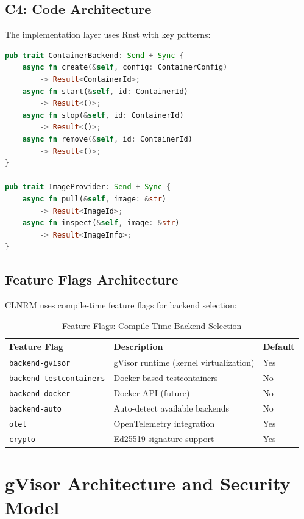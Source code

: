 \documentclass[12pt,twoside,openright]{book}
\theoremstyle{plain}
\theoremstyle{definition}
\theoremstyle{remark}
\begin{document}
\section{C4: Code Architecture}

The implementation layer uses Rust with key patterns:

\begin{lstlisting}[language=Rust, caption=Backend Abstraction Traits]
pub trait ContainerBackend: Send + Sync {
    async fn create(&self, config: ContainerConfig)
        -> Result<ContainerId>;
    async fn start(&self, id: ContainerId)
        -> Result<()>;
    async fn stop(&self, id: ContainerId)
        -> Result<()>;
    async fn remove(&self, id: ContainerId)
        -> Result<()>;
}

pub trait ImageProvider: Send + Sync {
    async fn pull(&self, image: &str)
        -> Result<ImageId>;
    async fn inspect(&self, image: &str)
        -> Result<ImageInfo>;
}
\end{lstlisting}

\section{Feature Flags Architecture}

CLNRM uses compile-time feature flags for backend selection:

\begin{table}[H]
\centering
\begin{tabular}{|l|p{4cm}|l|}
\hline
\textbf{Feature Flag} & \textbf{Description} & \textbf{Default} \\
\hline
\texttt{backend-gvisor} & gVisor runtime (kernel virtualization) & Yes \\
\hline
\texttt{backend-testcontainers} & Docker-based testcontainers & No \\
\hline
\texttt{backend-docker} & Docker API (future) & No \\
\hline
\texttt{backend-auto} & Auto-detect available backends & No \\
\hline
\texttt{otel} & OpenTelemetry integration & Yes \\
\hline
\texttt{crypto} & Ed25519 signature support & Yes \\
\hline
\end{tabular}
\caption{Feature Flags: Compile-Time Backend Selection}
\label{tab:feature_flags}
\end{table}

\chapter{gVisor Architecture and Security Model}
\end{document}
